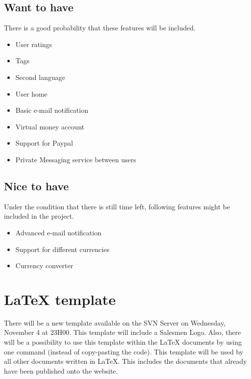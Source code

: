 \documentclass[a4paper, 12pt]{article}
\begin{document}
		\subsection{Want to have}
There is a good probability that these features will be included.
			\begin{itemize}
				\item User ratings
				\item Tags
				\item Second language
				\item User home
				\item Basic e-mail notification
				\item Virtual money account
				\item Support for Paypal
				\item Private Messaging service between users

			\end{itemize}
		
		\subsection{Nice to have}
Under the condition that there is still time left, following features might be included in the project.
			\begin{itemize}
				\item Advanced e-mail notification
				\item Support for different currencies
				\item Currency converter
			\end{itemize}
			
	\section{\LaTeX{} template}
There will be a new template available on the SVN Server on Wednesday, November 4 at 23H00. This template will include a Salesmen Logo. Also, there will be a possibility to use this template within the \LaTeX{} documents by using one command (instead of copy-pasting the code). This template will be used by all other documents written in \LaTeX{}. This includes the documents that already have been published onto the website.
\end{document}

